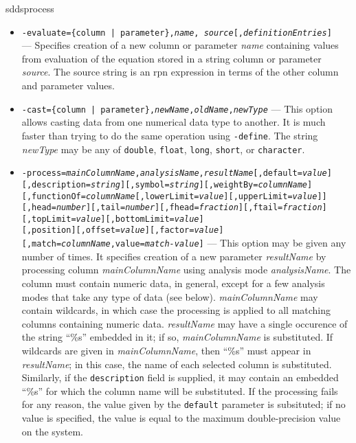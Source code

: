 \begin{sddsprog}{sddsprocess}
\begin{itemize}
\begin{itemize}
        \item {\tt -evaluate=\{column | parameter\},{\em name},{\em
source}[,{\em definitionEntries}]}\\ --- Specifies creation of a new column or parameter {\em name}
containing values from evaluation of the equation stored in a string column or parameter {\em source}.
The source string is an rpn expression in terms of the other column and parameter values.

        \item {\tt -cast=\{column | parameter\},{\em newName},{\em oldName},{\em newType}} --- This option allows
casting data from one numerical data type to another.  It is much faster than trying to do the same operation using
{\tt -define}.  The string {\em newType} may be any of {\tt double}, {\tt float}, {\tt long}, {\tt short}, or
{\tt character}.

        \item {\tt -process={\em mainColumnName},{\em analysisName},{\em resultName}[,default={\em value}]}
\\{\tt [,description={\em string}][,symbol={\em string}][,weightBy={\em columnName}]}
\\{\tt [,functionOf={\em columnName}[,lowerLimit={\em value}][,upperLimit={\em value}]]}
\\{\tt [,head={\em number}][,tail={\em number}][,fhead={\em fraction}][,ftail={\em fraction}]}
\\{\tt [,topLimit={\em value}][,bottomLimit={\em value}]} 
\\{\tt [,position][,offset={\em value}][,factor={\em value}]}
\\{\tt [,match={\em columnName},value={\em match-value}]} --- This option may be given
any number of times.  It specifies creation of a new parameter {\em resultName} by processing
column {\em mainColumnName} using analysis mode {\em analysisName}.  The column must contain
numeric data, in general, except for a few analysis modes that take any type of data (see below). {\em
mainColumnName} may contain wildcards, in which case the processing is applied to all matching
columns containing numeric data.  {\em resultName} may have a single occurence of the string
``\%s'' embedded in it; if so, {\em mainColumnName} is substituted.  If wildcards are given in
{\em mainColumnName}, then ``\%s'' must appear in {\em resultName}; in this case, the name of
each selected column is substituted.  Similarly, if the {\tt description} field is supplied,
it may contain an embedded ``\%s'' for which the column name will be substituted.
If the processing fails for any reason, the value given by the {\tt default} parameter is subsituted;
if no value is specified, the value is equal to the maximum double-precision value on the system.


\end{itemize}
\end{itemize}
\end{sddsprog}
